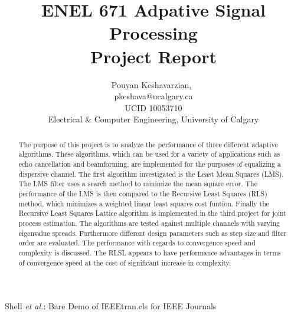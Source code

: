 \documentclass[journal]{IEEEtran}
\begin{document}
%
\title{ENEL 671 Adpative Signal Processing\\ Project Report}
%
%
%

\author{Pouyan Keshavarzian,~
\\ pkeshava@ucalgary.ca
\\ UCID 10053710
\\Electrical \& Computer Engineering, University of Calgary}

%
{Shell \MakeLowercase{\textit{et al.}}: Bare Demo of IEEEtran.cls for IEEE Journals}
%


\maketitle
\begin{abstract}
The purpose of this project is to analyze the performance of three different
adaptive algorithms. These algorithms, which can be used for a variety of
applications such as echo cancellation and beamforming, are implemented for
the purposes of equalizing a dispersive channel. The first algorithm
investigated is the Least Mean Squares (LMS). The LMS filter uses a search method to minimize the mean square error.
The performance of the LMS is then compared to the Recursive Least Squares (RLS) method, which minimizes a weighted linear least squares cost funtion.
Finally the Recursive Least Squares Lattice algorithm is implemented in the third project for joint process estimation.
The algorithms are tested against multiple channels with varying eigenvalue spreads. Furthermore
different design parameters such as step size and filter order are evaluated.
The performance with regards to convergence speed and complexity is discussed. The RLSL appears to have
performance advantages in terms of convergence speed at the cost of significant increase in complexity.
\end{abstract}
\end{document}

